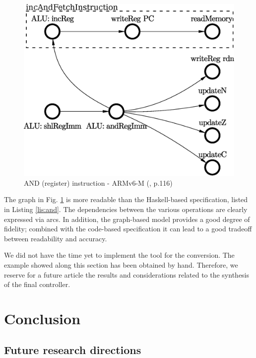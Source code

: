 \documentclass[conference]{IEEEtran}
\begin{document}
\begin{figure}[ht!]
\begin{center}
	\includegraphics[width=\linewidth]{IMG/and_RegT1.eps}
	\caption{AND (register) instruction - ARMv6-M (\cite{armManual}, p.116)}
	\label{fig:andPO}
\end{center}
\end{figure}

The graph in Fig. \ref{fig:andPO} is more readable than the Haskell-based specification,
listed in Listing \ref{lis:and}. The dependencies between the various operations are
clearly expressed via arcs. In addition, the graph-based model provides a good degree
of fidelity; combined with the code-based specification it can lead to a good tradeoff
between readability and accuracy.

We did not have the time yet to implement the tool for the conversion.
The example showed along this section has been obtained by hand. Therefore, we reserve for a
future article the results and considerations related to the synthesis of the final
controller.


\section{Conclusion}
\label{sec:conclusion}


\subsection{Future research directions}
\label{sec:frd}
\end{document}

